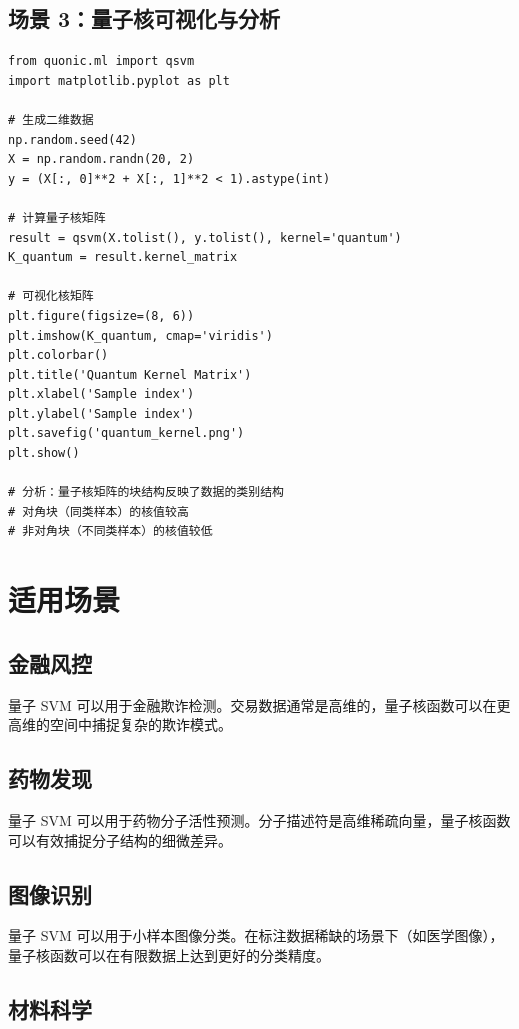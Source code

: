 \documentclass[12pt,a4paper]{article}
\begin{document}
\subsection{场景 3：量子核可视化与分析}

\begin{verbatim}
from quonic.ml import qsvm
import matplotlib.pyplot as plt

# 生成二维数据
np.random.seed(42)
X = np.random.randn(20, 2)
y = (X[:, 0]**2 + X[:, 1]**2 < 1).astype(int)

# 计算量子核矩阵
result = qsvm(X.tolist(), y.tolist(), kernel='quantum')
K_quantum = result.kernel_matrix

# 可视化核矩阵
plt.figure(figsize=(8, 6))
plt.imshow(K_quantum, cmap='viridis')
plt.colorbar()
plt.title('Quantum Kernel Matrix')
plt.xlabel('Sample index')
plt.ylabel('Sample index')
plt.savefig('quantum_kernel.png')
plt.show()

# 分析：量子核矩阵的块结构反映了数据的类别结构
# 对角块（同类样本）的核值较高
# 非对角块（不同类样本）的核值较低
\end{verbatim}

\section{适用场景}

\subsection{金融风控}

量子 SVM 可以用于金融欺诈检测。交易数据通常是高维的，量子核函数可以在更高维的空间中捕捉复杂的欺诈模式。

\subsection{药物发现}

量子 SVM 可以用于药物分子活性预测。分子描述符是高维稀疏向量，量子核函数可以有效捕捉分子结构的细微差异。

\subsection{图像识别}

量子 SVM 可以用于小样本图像分类。在标注数据稀缺的场景下（如医学图像），量子核函数可以在有限数据上达到更好的分类精度。

\subsection{材料科学}
\end{document}
